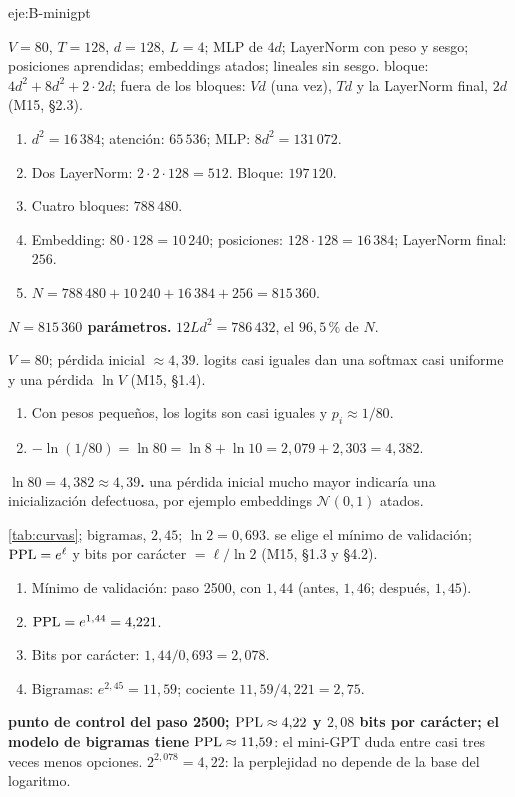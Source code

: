 \begin{solucion}{eje:B-minigpt}

\datos $V=80$, $T=128$, $d=128$, $L=4$; MLP de $4d$; LayerNorm con peso y sesgo; posiciones aprendidas; embeddings atados; lineales sin sesgo.
\planteamiento bloque: $4d^{2}+8d^{2}+2\cdot 2d$; fuera de los bloques: $Vd$ (una vez), $Td$ y la LayerNorm final, $2d$ (M15, §2.3).
\pasos
\begin{enumerate}[label=\arabic*.]
  \item $d^{2}=16\,384$; atención: $65\,536$; MLP: $8d^{2}=131\,072$.
  \item Dos LayerNorm: $2\cdot 2\cdot 128=512$. Bloque: $197\,120$.
  \item Cuatro bloques: $788\,480$.
  \item Embedding: $80\cdot 128=10\,240$; posiciones: $128\cdot 128=16\,384$; LayerNorm final: $256$.
  \item $N=788\,480+10\,240+16\,384+256=815\,360$.
\end{enumerate}
\resultado \textbf{$N=815\,360$ parámetros.}
\comprobacion $12Ld^{2}=786\,432$, el $96{,}5\,\%$ de $N$.

\datos $V=80$; pérdida inicial $\approx 4{,}39$.
\planteamiento logits casi iguales dan una softmax casi uniforme y una pérdida $\ln V$ (M15, §1.4).
\pasos
\begin{enumerate}[label=\arabic*.]
  \item Con pesos pequeños, los logits son casi iguales y $p_i\approx 1/80$.
  \item $-\ln(1/80)=\ln 80=\ln 8+\ln 10=2{,}079+2{,}303=4{,}382$.
\end{enumerate}
\resultado \textbf{$\ln 80=4{,}382\approx 4{,}39$.}
\comprobacion una pérdida inicial mucho mayor indicaría una inicialización defectuosa, por ejemplo embeddings $\mathcal N(0,1)$ atados.

\datos \cref{tab:curvas}; bigramas, $2{,}45$; $\ln 2=0{,}693$.
\planteamiento se elige el mínimo de validación; $\operatorname{PPL}=e^{\ell}$ y bits por carácter $=\ell/\ln 2$ (M15, §1.3 y §4.2).
\pasos
\begin{enumerate}[label=\arabic*.]
  \item Mínimo de validación: paso 2500, con $1{,}44$ (antes, $1{,}46$; después, $1{,}45$).
  \item $\operatorname{PPL}=e^{1{,}44}=4{,}221$.
  \item Bits por carácter: $1{,}44/0{,}693=2{,}078$.
  \item Bigramas: $e^{2{,}45}=11{,}59$; cociente $11{,}59/4{,}221=2{,}75$.
\end{enumerate}
\resultado \textbf{punto de control del paso 2500; $\operatorname{PPL}\approx 4{,}22$ y $2{,}08$ bits por carácter; el modelo de bigramas tiene $\operatorname{PPL}\approx 11{,}59$}: el mini-GPT duda entre casi tres veces menos opciones.
\comprobacion $2^{2{,}078}=4{,}22$: la perplejidad no depende de la base del logaritmo.


\end{solucion}
